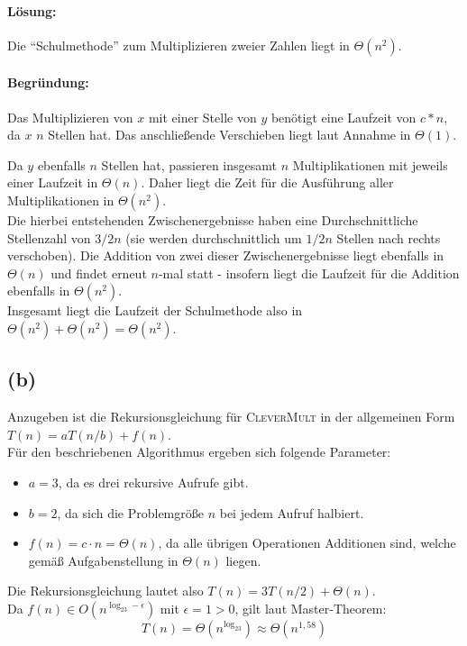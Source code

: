 \documentclass[a4paper,12pt]{article}
\begin{document}
\paragraph{Lösung:} Die "`Schulmethode"' zum Multiplizieren zweier Zahlen liegt in $\Theta(n^2)$.

\paragraph{Begründung:} Das Multiplizieren von $x$ mit einer Stelle von $y$ benötigt eine Laufzeit von $c*n$, da $x$ $n$ Stellen hat. Das anschließende Verschieben liegt laut Annahme in $\Theta(1)$.

Da $y$ ebenfalls $n$ Stellen hat, passieren insgesamt $n$ Multiplikationen mit jeweils einer Laufzeit in $\Theta(n)$. Daher liegt die Zeit für die Ausführung aller Multiplikationen in $\Theta(n^2)$.\\

Die hierbei entstehenden Zwischenergebnisse haben eine Durchschnittliche Stellenzahl von $3/2 n$ (sie werden durchschnittlich um $1/2 n$ Stellen nach rechts verschoben). Die Addition von zwei dieser Zwischenergebnisse liegt ebenfalls in $\Theta(n)$ und findet erneut $n$-mal statt - insofern liegt die Laufzeit für die Addition ebenfalls in $\Theta(n^2)$.\\

Insgesamt liegt die Laufzeit der Schulmethode also in $\Theta(n^2)+\Theta(n^2)=\Theta(n^2)$.

\subsection*{(b)}
Anzugeben ist die Rekursionsgleichung für \textsc{CleverMult} in der allgemeinen Form $T(n)=aT(n/b)+f(n)$.\\

\noindent Für den beschriebenen Algorithmus ergeben sich folgende Parameter:
\begin{itemize}
	\item $a=3$, da es drei rekursive Aufrufe gibt.
	\item $b=2$, da sich die Problemgröße $n$ bei jedem Aufruf halbiert.
	\item $f(n)=c\cdot n=\Theta(n)$, da alle übrigen Operationen Additionen sind, welche gemäß Aufgabenstellung in $\Theta(n)$ liegen.
\end{itemize}

\noindent Die Rekursionsgleichung lautet also $T(n)=3T(n/2)+\Theta(n)$.\\

\noindent Da $f(n)\in O(n^{\log_23-\epsilon})$ mit $\epsilon = 1 > 0$, gilt laut Master-Theorem:
$$T(n)=\Theta(n^{\log_23})\approx \Theta(n^{1,58})$$
\end{document}
